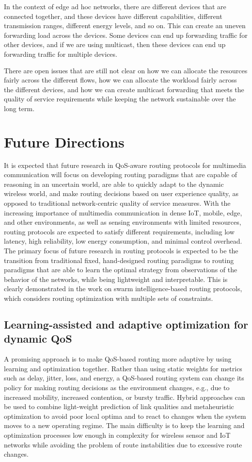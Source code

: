 \documentclass[12pt]{article}
\begin{document}
In the context of edge ad hoc networks, there are different devices that are connected together, and these devices have different capabilities, different transmission ranges, different energy levels, and so on. This can create an uneven forwarding load across the devices. Some devices can end up forwarding traffic for other devices, and if we are using multicast, then these devices can end up forwarding traffic for multiple devices.



There are open issues that are still not clear on how we can allocate the resources fairly across the different flows, how we can allocate the workload fairly across the different devices, and how we can create multicast forwarding that meets the quality of service requirements while keeping the network sustainable over the long term.
	\section{Future Directions}
    It is expected that future research in QoS-aware routing protocols for multimedia communication will focus on developing routing paradigms that are capable of reasoning in an uncertain world, are able to quickly adapt to the dynamic wireless world, and make routing decisions based on user experience quality, as opposed to traditional network-centric quality of service measures. With the increasing importance of multimedia communication in dense IoT, mobile, edge, and other environments, as well as sensing environments with limited resources, routing protocols are expected to satisfy different requirements, including low latency, high reliability, low energy consumption, and minimal control overhead. The primary focus of future research in routing protocols is expected to be the transition from traditional fixed, hand-designed routing paradigms to routing paradigms that are able to learn the optimal strategy from observations of the behavior of the networks, while being lightweight and interpretable. This is clearly demonstrated in the work on swarm intelligence-based routing protocols, which considers routing optimization with multiple sets of constraints.
    \subsection{Learning-assisted and adaptive optimization for dynamic QoS}
    A promising approach is to make QoS-based routing \cite{Benmansour2021} more adaptive by using learning and optimization together. Rather than using static weights for metrics such as delay, jitter, loss, and energy, a QoS-based routing system can change its policy for making routing decisions as the environment changes, e.g., due to increased mobility, increased contention, or bursty traffic. Hybrid approaches can be used to combine light-weight prediction of link qualities and metaheuristic optimization to avoid poor local optima and to react to changes when the system moves to a new operating regime. The main difficulty is to keep the learning and optimization processes low enough in complexity for wireless sensor and IoT networks while avoiding the problem of route instabilities due to excessive route changes.
\end{document}
